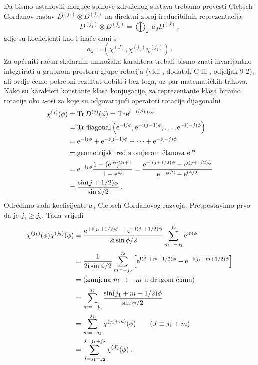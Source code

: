 Da bismo ustanovili moguće spinove združenog sustava trebamo
provesti Clebsch-Gordanov rastav $D^{(j_1)}\otimes D^{(j_2)}$ na direktni
zbroj ireducibilnih reprezentacija
\begin{displaymath}
  D^{(j_1)}\otimes D^{(j_2)} =
  \bigoplus_{J}\: a_{J}D^{(J)} \,,
\end{displaymath}
gdje su koeficijenti kao i inače dani s
\begin{displaymath}
a_J = \left( \chi^{(J)}, \chi^{(j_1)} \chi^{(j_2)} \right) \,.
\end{displaymath}
Za općeniti račun skalarnih umnožaka karaktera trebali bismo
znati invarijantno integrirati u grupnom prostoru grupe rotacija (vidi \cite{Jones:1998},
dodatak C ili \cite{Hamermesh:1989}, odjeljak 9-2), ali ovdje ćemo potrebni rezultat
dobiti i bez toga, uz par matematičkih trikova.
Kako su karakteri konstante klasa konjugacije, za reprezentante 
klasa biramo rotacije oko $z$-osi za koje su odgovarajući operatori
rotacije dijagonalni
\begin{equation}
\begin{split}
 \chi^{(j)}(\phi) &= \operatorname{Tr} D^{(j)}(\phi) = \operatorname{Tr} \textrm{e}^{(-\textrm{i}/\hbar)J_3 \phi} \\
 &= \operatorname{Tr} \textrm{diagonal}\left( \textrm{e}^{-\textrm{i} j\phi }, \textrm{e}^{-\textrm{i} (j-1)\phi}, \ldots,
\textrm{e}^{-\textrm{i}(-j)\phi}\right)\\
&= \textrm{e}^{-\textrm{i} j\phi } + \textrm{e}^{-\textrm{i} (j-1)\phi} + \cdots + \textrm{e}^{-\textrm{i}(-j)\phi}\\
&= \text{geometrijski red s omjerom članova $\textrm{e}^{\textrm{i} \phi}$} \\
&= \textrm{e}^{-\textrm{i} j\phi} \frac{1- (\textrm{e}^{\textrm{i} \phi})^{2j+1}}{1-\textrm{e}^{\textrm{i}\phi}}
= \frac{\textrm{e}^{-\textrm{i}(j+1/2)\phi} - \textrm{e}^{\textrm{i}(j+1/2)\phi}}{\textrm{e}^{-\textrm{i}\phi/2}-\textrm{e}^{\textrm{i}\phi/2}}\\
&= \frac{\sin(j+1/2)\phi}{\sin\phi/2} \,.
\end{split}
\end{equation}
Odredimo sada koeficijente $a_J$ Clebsch-Gordanovog razvoja. Pretpostavimo
prvo da je $j_1 \ge j_2$. Tada vrijedi
\begin{equation}
\begin{split}
\chi^{(j_1)}(\phi)\chi^{(j_2)}(\phi)&=
 \frac{\textrm{e}^{+\textrm{i}(j_1+1/2)\phi} - \textrm{e}^{-\textrm{i}(j_1+1/2)\phi}}{2\textrm{i}\sin\phi/2}
\sum_{m=-j_2}^{j_2}\textrm{e}^{\textrm{i} m \phi}\\
&= \frac{1}{2 \textrm{i} \sin\phi/2} \sum_{m=-j_2}^{j_2}
\left[ \textrm{e}^{\textrm{i}(j_1+m+1/2)\phi} - \textrm{e}^{-\textrm{i}(j_1-m+1/2)\phi}\right]\\
&= (\text{zamjena $m\to -m$ u drugom članu}) \\
&=\sum_{m=-j_2}^{j_2} \frac{\sin(j_1+m+1/2)\phi}{\sin\phi/2}\\
&=\sum_{m=-j_2}^{j_2} \chi^{(j_1 + m)}(\phi) \qquad (J\equiv j_1 +m) \\
&=\sum_{J=j_1-j_2}^{J=j_1+j_2} \chi^{(J)}(\phi) \;.
\end{split}
\end{equation}
